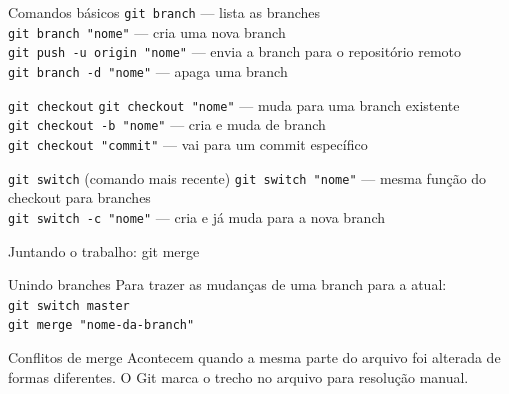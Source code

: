 \begin{frame}
  \begin{block}{Comandos básicos}
    \texttt{git branch} \quad — lista as branches \\
    \texttt{git branch "nome"} \quad — cria uma nova branch \\
    \texttt{git push -u origin "nome"} \quad — envia a branch para o repositório remoto \\
    \texttt{git branch -d "nome"} \quad — apaga uma branch
  \end{block}
  \begin{block}{\texttt{git checkout}}
    \texttt{git checkout "nome"} \quad — muda para uma branch existente \\
    \texttt{git checkout -b "nome"} \quad — cria e muda de branch \\
    \texttt{git checkout "commit"} \quad — vai para um commit específico
  \end{block}
  \begin{block}{\texttt{git switch} (comando mais recente)}
    \texttt{git switch "nome"} \quad — mesma função do checkout para branches \\
    \texttt{git switch -c "nome"} \quad — cria e já muda para a nova branch
  \end{block}
\end{frame}

\begin{frame}{Juntando o trabalho: git merge}
  \begin{block}{Unindo branches}
    Para trazer as mudanças de uma branch para a atual:
    \vspace{0.2cm} \\
    \texttt{git switch master} \\
    \texttt{git merge "nome-da-branch"}
  \end{block}
  \begin{alertblock}{Conflitos de merge}
    Acontecem quando a mesma parte do arquivo foi alterada de formas diferentes. O Git marca o trecho no arquivo para resolução manual.
  \end{alertblock}
\end{frame}



